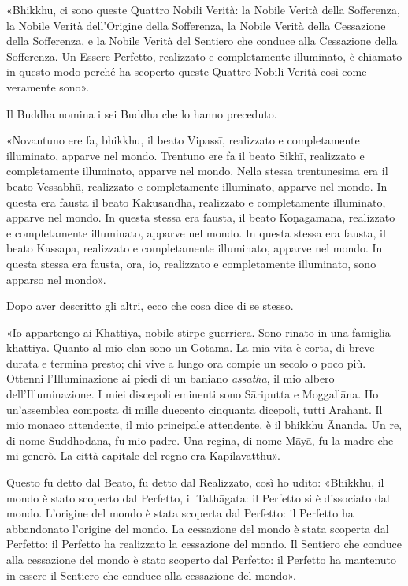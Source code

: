 

«Bhikkhu, ci sono queste Quattro Nobili Verità: la Nobile Verità della
Sofferenza, la Nobile Verità dell’Origine della Sofferenza, la Nobile
Verità della Cessazione della Sofferenza, e la Nobile Verità del
Sentiero che conduce alla Cessazione della Sofferenza. Un Essere
Perfetto, realizzato e completamente illuminato, è chiamato in questo
modo perché ha scoperto queste Quattro Nobili Verità così come veramente
sono».




 Il Buddha nomina i sei Buddha che lo hanno preceduto.


 «Novantuno ere fa, bhikkhu, il beato Vipassī, realizzato e
completamente illuminato, apparve nel mondo. Trentuno ere fa il beato
Sikhī, realizzato e completamente illuminato, apparve nel mondo. Nella
stessa trentunesima era il beato Vessabhū, realizzato e completamente
illuminato, apparve nel mondo. In questa era fausta il beato Kakusandha,
realizzato e completamente illuminato, apparve nel mondo. In questa
stessa era fausta, il beato Koṇāgamana, realizzato e completamente
illuminato, apparve nel mondo. In questa stessa era fausta, il beato
Kassapa, realizzato e completamente illuminato, apparve nel mondo. In
questa stessa era fausta, ora, io, realizzato e completamente
illuminato, sono apparso nel mondo».




 Dopo aver descritto gli altri, ecco che cosa dice di se
stesso.


 «Io appartengo ai Khattiya, nobile stirpe guerriera. Sono
rinato in una famiglia khattiya. Quanto al mio clan sono un Gotama. La
mia vita è corta, di breve durata e termina presto; chi vive a lungo ora
compie un secolo o poco più. Ottenni l’Illuminazione ai piedi di un
baniano \emph{assatha}, il mio albero dell’Illuminazione. I miei discepoli
eminenti sono Sāriputta e Moggallāna. Ho un’assemblea composta di
mille duecento cinquanta dicepoli, tutti Arahant. Il mio monaco
attendente, il mio principale attendente, è il bhikkhu Ānanda. Un re, di
nome Suddhodana, fu mio padre. Una regina, di nome Māyā, fu la madre che
mi generò. La città capitale del regno era Kapilavatthu».




Questo fu detto dal Beato, fu detto dal Realizzato, così ho udito:
«Bhikkhu, il mondo è stato scoperto dal Perfetto, il Tathāgata: il
Perfetto si è dissociato dal mondo. L’origine del mondo è stata scoperta
dal Perfetto: il Perfetto ha abbandonato l’origine del mondo. La
cessazione del mondo è stata scoperta dal Perfetto: il Perfetto ha
realizzato la cessazione del mondo. Il Sentiero che conduce alla
cessazione del mondo è stato scoperto dal Perfetto: il Perfetto ha
mantenuto in essere il Sentiero che conduce alla cessazione del mondo».


